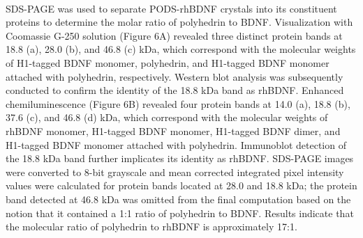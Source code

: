 \documentclass[review]{elsarticle}
\begin{document}
SDS-PAGE was used to separate PODS\textsuperscript{\textregistered}-rhBDNF crystals into its constituent proteins to determine the molar ratio of polyhedrin to BDNF. Visualization with Coomassie G-250 solution (Figure 6A) revealed three distinct protein bands at 18.8 (a), 28.0 (b), and 46.8 (c) kDa, which correspond with the molecular weights of H1-tagged BDNF monomer, polyhedrin, and H1-tagged BDNF monomer attached with polyhedrin, respectively. Western blot analysis was subsequently conducted to confirm the identity of the 18.8 kDa band as rhBDNF. Enhanced chemiluminescence (Figure 6B) revealed four protein bands at 14.0 (a), 18.8 (b), 37.6 (c), and 46.8 (d) kDa, which correspond with the molecular weights of rhBDNF monomer, H1-tagged BDNF monomer, H1-tagged BDNF dimer, and H1-tagged BDNF monomer attached with polyhedrin. Immunoblot detection of the 18.8 kDa band further implicates its identity as rhBDNF. SDS-PAGE images were converted to 8-bit grayscale and mean corrected integrated pixel intensity values were calculated for protein bands located at 28.0 and 18.8 kDa; the protein band detected at 46.8 kDa was omitted from the final computation based on the notion that it contained a 1:1 ratio of polyhedrin to BDNF. Results indicate that the molecular ratio of polyhedrin to rhBDNF is approximately 17:1.
\end{document}
